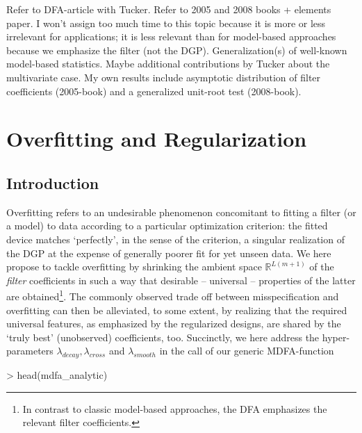 \documentclass[a4paper]{book}
\begin{document}
Refer to DFA-article with Tucker. Refer to 2005 and 2008 books + elements paper. I won't assign too much time to this topic because it is more or less irrelevant for applications; it is less relevant than for model-based approaches because we emphasize the filter (not the DGP). Generalization(s) of well-known model-based statistics. Maybe additional contributions by Tucker about the multivariate case. My own results include asymptotic distribution of filter coefficients (2005-book) and a generalized unit-root test (2008-book).








\chapter{Overfitting and Regularization}\label{reg_sec}

\section{Introduction}


Overfitting refers to an undesirable phenomenon concomitant to fitting a filter (or a model) to data according to a particular optimization criterion: the fitted device matches `perfectly', in the sense of the criterion, a singular realization of the DGP at the expense of generally poorer fit for yet unseen data. We here propose to tackle overfitting by shrinking the ambient space $\mathbb{R}^{L(m+1)}$ of the \emph{filter} coefficients in such a way that desirable -- universal -- properties of the latter are obtained\footnote{In contrast to classic model-based approaches, the DFA  emphasizes the relevant filter coefficients.}. The commonly observed trade off between misspecification and overfitting can then be alleviated,  to some extent, by realizing that the required universal features, as emphasized by the regularized designs, are shared by the `truly best' (unobserved) coefficients, too. Succinctly,  we here address the hyper-parameters $\lambda_{decay},\lambda_{cross}$ and $\lambda_{smooth}$ in the call of our generic MDFA-function
\begin{Schunk}
\begin{Sinput}
> head(mdfa_analytic)
\end{Sinput}
\begin{Soutput}
1 function (L, lambda, weight_func, Lag, Gamma, eta, cutoff, i1,             
2     i2, weight_constraint, lambda_cross, lambda_decay, lambda_smooth,      
3     lin_eta, shift_constraint, grand_mean, b0_H0, c_eta, weight_structure, 
4     white_noise, synchronicity, lag_mat, troikaner)                        
5 {                                                                          
6     lambda <- abs(lambda)                                                  
\end{Soutput}
\end{Schunk}
\end{document}
